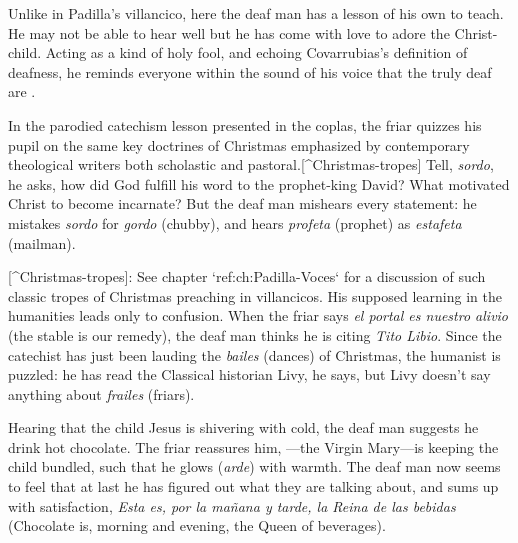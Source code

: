 \label{music:Ruiz-Sordos-dialogue}

Unlike in Padilla's villancico, here the deaf man has a lesson of his own to teach.
He may not be able to hear well but he has come with love to adore the Christ-child.
Acting as a kind of holy fool, and echoing Covarrubias's definition of deafness, he reminds everyone within the sound of his voice that the truly deaf are .

In the parodied catechism lesson presented in the coplas, the friar quizzes his pupil on the same key doctrines of Christmas emphasized by contemporary theological writers both scholastic and pastoral.[^Christmas-tropes]  Tell, \emph{sordo}, he asks, how did God fulfill his word to the prophet-king David? What motivated Christ to become incarnate? But the deaf man mishears every statement: he mistakes \emph{sordo} for \emph{gordo} (chubby), and hears \emph{profeta} (prophet) as \emph{estafeta} (mailman).

[^Christmas-tropes]: See chapter `ref:ch:Padilla-Voces` for a discussion of such classic tropes of Christmas preaching in villancicos.
His supposed learning in the humanities leads only to confusion.
When the friar says \emph{el portal es nuestro alivio} (the stable is our remedy), the deaf man thinks he is citing \emph{Tito Libio}.
Since the catechist has just been lauding the \emph{bailes} (dances) of Christmas, the humanist is puzzled: he has read the Classical historian Livy, he says, but Livy doesn't say anything about \emph{frailes} (friars).

Hearing that the child Jesus is shivering with cold, the deaf man suggests he drink hot chocolate.
The friar reassures him, ---the Virgin Mary---is keeping the child bundled, such that he glows (\emph{arde}) with warmth.
The deaf man now seems to feel that at last he has figured out what they are talking about, and sums up with satisfaction, \emph{Esta es, por la mañana y tarde, la Reina de las bebidas} (Chocolate is, morning and evening, the Queen of beverages).


